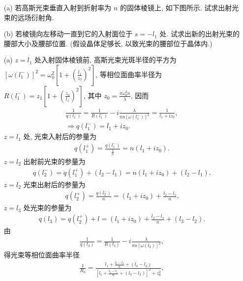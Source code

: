\documentclass{note}
\begin{document}
\begin{exe}
    \begin{itemize}
        \item[(a)] 若高斯光束垂直入射到折射率为 $n$ 的固体棱镜上, 如下图所示.
        试求出射光束的远场衍射角.
        \item[(b)] 若棱镜向左移动一直到它的入射面位于 $s=-l_1$ 处. 试求出新的出射光束的腰部大小及腰部位置. (假设晶体足够长, 以致光束的腰部位于晶体内.)
    \end{itemize}
\end{exe}
\begin{sol}
    \begin{itemize}
        \item[(a)] $z=l_1$ 处入射固体棱镜前, 高斯光束光斑半径的平方为 $[\omega(l_1^-)]^2=\omega_0^2\left[1+\left(\frac{l_1}{z_0}\right)^2\right]$, 等相位面曲率半径为 $R(l_1^-)=z_1\left[1+\left(\frac{z_0}{l_1}\right)^2\right]$, 其中 $z_0=\frac{\pi\omega_0^2n}{\lambda}$, 因而
        \begin{gather}
            \frac{1}{q(l_1^-)}=\frac{1}{R(l_1^-)}-i\frac{\lambda}{\pi n[\omega(l_1^-)]^2}=\frac{1}{l_1+iz_0},\\
            \Longrightarrow q(l_1^-)=l_1+iz_0.
        \end{gather}
        $z=l_1$ 处, 光束入射后的参量为
        \begin{align}
            q(l_1^+)=\frac{q(l_1^-)}{\frac{1}{n}}=n(l_1+iz_0).
        \end{align}
        $z=l_2$ 出射前光束的参量为
        \begin{align}
            q(l_2^-)=q(l_1^+)+(l_2-l_1)=n(l_1+iz_0)+(l_2-l_1).
        \end{align}
        $z=l_2$ 光束出射后的参量为
        \begin{align}
            q(l_2^+)=\frac{q(l_2^-)}{n}=(l_1+iz_0)+\frac{l_2-l_1}{n}.
        \end{align}
        $z=l_3$ 处光束的参量为
        \begin{align}
            q(l_3)=q(l_2^+)+l=(l_1+iz_0)+\frac{l_2-l_1}{n}+(l_3-l_2).
        \end{align}
        由
        \begin{align}
            \frac{1}{q(l_3)}=\frac{1}{R(l_3)}-i\frac{\lambda}{\pi n[\omega(l_3)]^2},
        \end{align}
        得光束等相位面曲率半径
        \begin{align}
            \frac{1}{R_3}=\frac{l_1+\frac{l_2-l_1}{n}+(l_3-l_2)}{\left[l_1+\frac{l_2-l_1}{n}+(l_3-l_2)\right]^2+z_0^2},

\end{align}
\end{itemize}
\end{sol}
\end{document}
